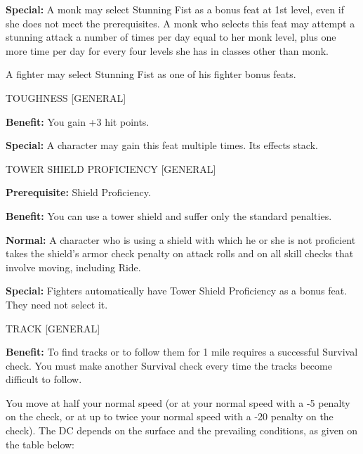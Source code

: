 \documentclass{article}
\begin{document}
\textbf{Special:} A monk may select Stunning Fist as a bonus feat at 1st level, 
even if she does not meet the prerequisites. A monk who selects this feat may attempt 
a stunning attack a number of times per day equal to her monk level, plus one more 
time per day for every four levels she has in classes other than monk.

A fighter may select Stunning Fist as one of his fighter bonus feats.

\vspace{12pt}
TOUGHNESS [GENERAL]

\textbf{Benefit:} You gain +3 hit points.

\textbf{Special:} A character may gain this feat multiple times. Its effects stack.

\vspace{12pt}
TOWER SHIELD PROFICIENCY [GENERAL]

\textbf{Prerequisite:} Shield Proficiency.

\textbf{Benefit:} You can use a tower shield and suffer only the standard penalties.

\textbf{Normal:} A character who is using a shield with which he or she is not 
proficient takes the shield's armor check penalty on attack rolls and on all skill 
checks that involve moving, including Ride.

\textbf{Special:} Fighters automatically have Tower Shield Proficiency as a bonus 
feat. They need not select it.

\vspace{12pt}
TRACK [GENERAL]

\textbf{Benefit:} To find tracks or to follow them for 1 mile requires a successful 
Survival check. You must make another Survival check every time the tracks become 
difficult to follow.

You move at half your normal speed (or at your normal speed with a -5 penalty on 
the check, or at up to twice your normal speed with a -20 penalty on the check). 
The DC depends on the surface and the prevailing conditions, as given on the table 
below:
\end{document}

